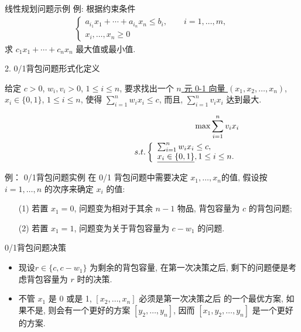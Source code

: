 \documentclass[fontset=fandol,UTF8,fleqn]{beamer}
\begin{document}
\begin{frame}{线性规划问题示例}
例: 根据约束条件 
\begin{eqnarray*}
  \left\{\begin{array}{ll}
 a_{i_1}x_1+\cdots +a_{i_n}x_n\leq b_i, \qquad i=1,\ldots, m, \\
x_i, \ldots, x_n \geq 0 
\end{array}\right. 
\end{eqnarray*}
求 
\underline{$c_1x_1+\cdots +c_nx_n$} 最大值或最小值.  
\end{frame}

\begin{frame}{2. 0/1背包问题形式化定义}
  \begin{definition}[0/1背包问题形式化]
     给定 $c>0$, $w_i, v_i > 0$, $1\leq i\leq n$, 要求找出一个 \underline{$n$ 元 0-1 向量 $(x_1, x_2,\ldots ,x_n)$}, $x_i\in \{0,1\}$, $1\leq i\leq n$, 使得 $\sum_{i=1}^nw_ix_i \leq c$, 而且, $\sum_{i=1}^nv_ix_i$ 达到最大.  
   \end{definition} \pause
   \begin{eqnarray*}
\hspace*{2cm}     \mathrm{max}\sum_{i=1}^nv_ix_i \\
\hspace*{3cm}  s.t. \left\{\begin{array}{ll}
\sum_{i=1}^nw_ix_i \leq c,   \\
\underline{x_i \in \{0, 1\}}, 1\leq i \leq n.
\end{array}\right.  
\end{eqnarray*}
\end{frame}

\begin{frame}{例： 0/1背包问题实例}
 在 0/1 背包问题中需要决定 $x_1, \ldots, x_n$的值, 假设按 $i =1,\ldots,n$ 的次序来确定 $x_i$ 的值: 
\begin{itemize}[<+-|alert@+>]
\item[(1)] 若置 $x_1 =0$, 问题变为相对于其余 $n-1$ 物品, 背包容量为 $c$ 的背包问题; 
\item[(2)] 若置 $x_1 =1$, 问题变为关于背包容量为 $c-w_1$ 的问题.
\end{itemize}
\end{frame}

\begin{frame}{0/1背包问题决策}
  \begin{itemize}[<+-|alert@+>]
\item 现设$r\in \{c,c-w_1\}$ 为剩余的背包容量, 在第一次决策之后, 剩下的问题便是考虑背包容量为 $r$ 时的决策.
\item 不管 $x_1$ 是 0 或是 1, $[x_2,\ldots, x_n]$ 必须是第一次决策之后
  的一个最优方案, 如果不是, 则会有一个更好的方案 $[y_2,\ldots, y_n]$,
  因而 $[x_1,y_2,\ldots,y_n]$ 是一个更好的方案.
 \end{itemize}
\end{frame}
\end{document}
